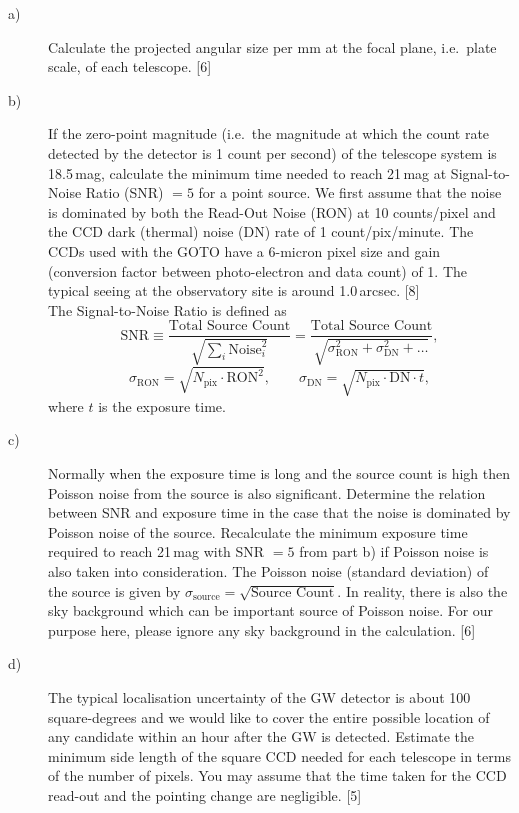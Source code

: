 \begin{description}
\item[a)] Calculate the projected angular size per mm at the focal plane, i.e.\
  plate scale, of each telescope. \hfill[6]
\item[b)] If the zero-point magnitude (i.e.\ the magnitude at which the count
  rate detected by the detector is 1 count per second) of the telescope system
  is 18.5\,mag, calculate the minimum time needed to reach 21\,mag at
  Signal-to-Noise Ratio (SNR) $= 5$ for a point source. We first assume that
  the noise is dominated by both the Read-Out Noise (RON) at 10 counts/pixel
  and the CCD dark (thermal) noise (DN) rate of 1 count/pix/minute. The CCDs
  used with the GOTO have a 6-micron pixel size and gain (conversion factor
  between photo-electron and data count) of 1. The typical seeing at the
  observatory site is around 1.0\,arcsec. \hfill[8]\\
  The Signal-to-Noise Ratio is defined as
  \[ \mathrm{SNR} \equiv
     \frac{\text{Total Source Count}}{\sqrt{\sum_i \mathrm{Noise}_i^2}}
     = \frac{\text{Total Source Count}}
            {\sqrt{\sigma_{\mathrm{RON}}^2 + \sigma_{\mathrm{DN}}^2 + \dots}},
  \]
  \[ \sigma_{\mathrm{RON}} = \sqrt{N_{\mathrm{pix}} \cdot \mathrm{RON}^2},
     \qquad
     \sigma_{\mathrm{DN}} = \sqrt{N_{\mathrm{pix}} \cdot \mathrm{DN} \cdot t},
  \]
  where $t$ is the exposure time.
\item[c)] Normally when the exposure time is long and the source count is high
  then Poisson noise from the source is also significant. Determine the
  relation between SNR and exposure time in the case that the noise is
  dominated by Poisson noise of the source. Recalculate the minimum exposure
  time required to reach 21\,mag with SNR $= 5$ from part b) if Poisson noise
  is also taken into consideration. The Poisson noise (standard deviation) of
  the source is given by
  $\sigma_{\mathrm{source}} = \sqrt{\text{Source Count}}$. In reality, there is
  also the sky background which can be important source of Poisson noise. For
  our purpose here, please ignore any sky background in the calculation.
  \hfill[6]
\item[d)] The typical localisation uncertainty of the GW detector is about 100
  square-degrees and we would like to cover the entire possible location of any
  candidate within an hour after the GW is detected. Estimate the minimum side
  length of the square CCD needed for each telescope in terms of the number of
  pixels. You may assume that the time taken for the CCD read-out and the
  pointing change are negligible. \hfill[5]
\end{description}

